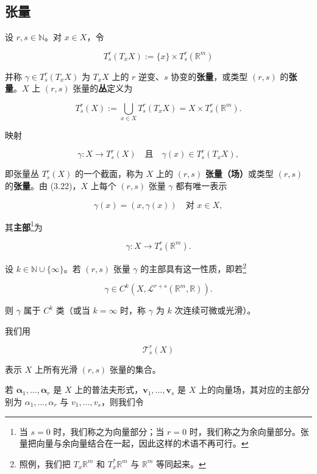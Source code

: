 \subsection*{张量}

设 $ r, s \in \mathbb{N} $。对 $ x \in X $，令

\begin{equation}
T_{s}^{r}(T_{x}X) := \{x\} \times T_{s}^{r}(\mathbb{R}^{m})\tag{3.22}
\end{equation}

并称 $ \gamma \in T_{s}^{r}(T_{x}X) $ 为 $ T_{x}X $ 上的 $ r $ 逆变、$ s $ 协变的\textbf{张量}，或类型 $ (r,s) $ 的\textbf{张量}。$ X $ 上 $ (r,s) $ 张量的\textbf{丛}定义为

\[
T_{s}^{r}(X) := \bigcup_{x\in X} T_{s}^{r}(T_{x}X) = X \times T_{s}^{r}(\mathbb{R}^{m}).
\]

映射

\[
\gamma : X \to T_{s}^{r}(X) \quad \text{且} \quad \gamma(x) \in T_{s}^{r}(T_{x}X),
\]

即张量丛 $ T_{s}^{r}(X) $ 的一个截面，称为 $ X $ 上的 $ (r,s) $ \textbf{张量（场）}或类型 $ (r,s) $ 的\textbf{张量}。由 (3.22)，$ X $ 上每个 $ (r,s) $ 张量 $ \gamma $ 都有唯一表示

\[
\gamma(x) = (x, \gamma(x)) \quad \text{对 } x \in X,
\]

其\textbf{主部}\footnote{当 $ s = 0 $ 时，我们称之为向量部分；当 $ r = 0 $ 时，我们称之为余向量部分。张量把向量与余向量结合在一起，因此这样的术语不再可行。}为

\[
\gamma : X \to T_{s}^{r}(\mathbb{R}^{m}).
\]

设 $ k \in \mathbb{N} \cup \{\infty\} $。若 $ (r,s) $ 张量 $ \gamma $ 的主部具有这一性质，即若\footnote{照例，我们把 $ T_{x}\mathbb{R}^{m} $ 和 $ T_{x}^{\ast}\mathbb{R}^{m} $ 与 $ \mathbb{R}^{m} $ 等同起来。}

\[
\gamma \in C^{k}\left(X, \mathcal{L}^{r+s}(\mathbb{R}^{m}, \mathbb{R})\right).
\]

则 $ \gamma $ 属于 $ C^{k} $ 类（或当 $ k = \infty $ 时，称 $ \gamma $ 为 $ k $ 次连续可微或光滑）。

我们用

\[
\mathcal{T}_{s}^{r}(X)
\]

表示 $ X $ 上所有光滑 $ (r,s) $ 张量的集合。

若 $ \boldsymbol{\alpha}_{1}, \ldots, \boldsymbol{\alpha}_{r} $ 是 $ X $ 上的普法夫形式，$ \boldsymbol{v}_{1}, \ldots, \boldsymbol{v}_{s} $ 是 $ X $ 上的向量场，其对应的主部分别为 $ \alpha_{1}, \ldots, \alpha_{r} $ 与 $ v_{1}, \ldots, v_{s} $，则我们令

